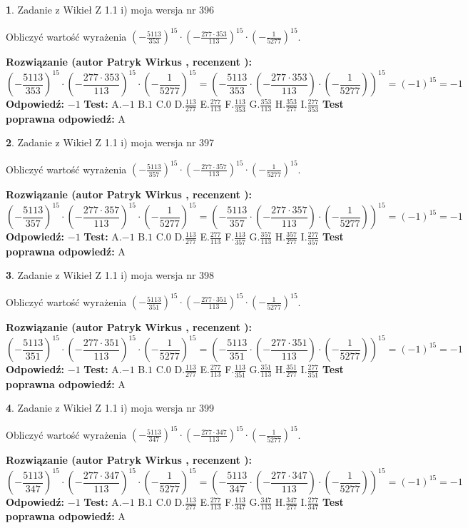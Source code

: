 \documentclass[12pt, a4paper]{article}
\theoremstyle{definition} %
\newtheorem{zad}{}
\newcommand{\zadStart}[1]{\begin{zad}#1\newline}
\newcommand{\zadStop}{\end{zad}}
\newcommand{\rozwStart}[2]{\noindent \textbf{Rozwiązanie (autor #1 , recenzent #2): }\newline}
\newcommand{\rozwStop}{\newline}
\newcommand{\odpStart}{\noindent \textbf{Odpowiedź:}\newline}
\newcommand{\odpStop}{\newline}
\newcommand{\testStart}{\noindent \textbf{Test:}\newline}
\newcommand{\testStop}{\newline}
\newcommand{\kluczStart}{\noindent \textbf{Test poprawna odpowiedź:}\newline}
\newcommand{\kluczStop}{\newline}
\begin{document}
\zadStart{Zadanie z Wikieł Z 1.1 i) moja wersja nr 396}

Obliczyć wartość wyrażenia $(-\frac{5113}{353})^{15} \cdot (-\frac{277 \cdot 353}{113})^{15} \cdot (-\frac{1}{5277})^{15}$.
\zadStop
\rozwStart{Patryk Wirkus}{}
$$(-\frac{5113}{353})^{15} \cdot (-\frac{277 \cdot 353}{113})^{15} \cdot (-\frac{1}{5277})^{15} = (-\frac{5113}{353} \cdot (-\frac{277 \cdot 353}{113}) \cdot (-\frac{1}{5277}))^{15} = (-1)^{15} = -1$$
\rozwStop
\odpStart
$-1$
\odpStop
\testStart
A.$-1$ B.$1$ C.$0$ D.$\frac{113}{277}$ E.$\frac{277}{113}$
F.$\frac{113}{353}$ G.$\frac{353}{113}$
H.$\frac{353}{277}$
I.$\frac{277}{353}$
\testStop
\kluczStart
A
\kluczStop



\zadStart{Zadanie z Wikieł Z 1.1 i) moja wersja nr 397}

Obliczyć wartość wyrażenia $(-\frac{5113}{357})^{15} \cdot (-\frac{277 \cdot 357}{113})^{15} \cdot (-\frac{1}{5277})^{15}$.
\zadStop
\rozwStart{Patryk Wirkus}{}
$$(-\frac{5113}{357})^{15} \cdot (-\frac{277 \cdot 357}{113})^{15} \cdot (-\frac{1}{5277})^{15} = (-\frac{5113}{357} \cdot (-\frac{277 \cdot 357}{113}) \cdot (-\frac{1}{5277}))^{15} = (-1)^{15} = -1$$
\rozwStop
\odpStart
$-1$
\odpStop
\testStart
A.$-1$ B.$1$ C.$0$ D.$\frac{113}{277}$ E.$\frac{277}{113}$
F.$\frac{113}{357}$ G.$\frac{357}{113}$
H.$\frac{357}{277}$
I.$\frac{277}{357}$
\testStop
\kluczStart
A
\kluczStop



\zadStart{Zadanie z Wikieł Z 1.1 i) moja wersja nr 398}

Obliczyć wartość wyrażenia $(-\frac{5113}{351})^{15} \cdot (-\frac{277 \cdot 351}{113})^{15} \cdot (-\frac{1}{5277})^{15}$.
\zadStop
\rozwStart{Patryk Wirkus}{}
$$(-\frac{5113}{351})^{15} \cdot (-\frac{277 \cdot 351}{113})^{15} \cdot (-\frac{1}{5277})^{15} = (-\frac{5113}{351} \cdot (-\frac{277 \cdot 351}{113}) \cdot (-\frac{1}{5277}))^{15} = (-1)^{15} = -1$$
\rozwStop
\odpStart
$-1$
\odpStop
\testStart
A.$-1$ B.$1$ C.$0$ D.$\frac{113}{277}$ E.$\frac{277}{113}$
F.$\frac{113}{351}$ G.$\frac{351}{113}$
H.$\frac{351}{277}$
I.$\frac{277}{351}$
\testStop
\kluczStart
A
\kluczStop



\zadStart{Zadanie z Wikieł Z 1.1 i) moja wersja nr 399}

Obliczyć wartość wyrażenia $(-\frac{5113}{347})^{15} \cdot (-\frac{277 \cdot 347}{113})^{15} \cdot (-\frac{1}{5277})^{15}$.
\zadStop
\rozwStart{Patryk Wirkus}{}
$$(-\frac{5113}{347})^{15} \cdot (-\frac{277 \cdot 347}{113})^{15} \cdot (-\frac{1}{5277})^{15} = (-\frac{5113}{347} \cdot (-\frac{277 \cdot 347}{113}) \cdot (-\frac{1}{5277}))^{15} = (-1)^{15} = -1$$
\rozwStop
\odpStart
$-1$
\odpStop
\testStart
A.$-1$ B.$1$ C.$0$ D.$\frac{113}{277}$ E.$\frac{277}{113}$
F.$\frac{113}{347}$ G.$\frac{347}{113}$
H.$\frac{347}{277}$
I.$\frac{277}{347}$
\testStop
\kluczStart
A
\kluczStop
\end{document}
